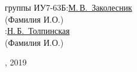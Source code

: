 \begin{titlepage}
\begin{center}
\newlength{\ML}
 группы ИУ7-63Б:\hspace{0.2cm}\underline{М.\,В.~Заколесник}\\
\hfill\hspace{1.7cm} (Фамилия И.О.)\\
:\hspace{0.2cm}\underline{Н.\,Б.~Толпинская}\\
\hfill\hspace{1.7cm} (Фамилия И.О.)\\

\end{center}
%

\vspace{0pt plus4fill} %
{, 2019\par}
\end{titlepage}